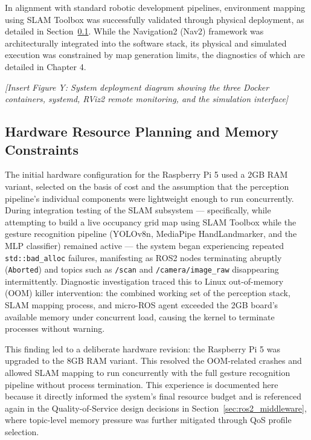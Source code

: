 In alignment with standard robotic development pipelines, environment mapping using SLAM Toolbox was successfully validated through physical deployment, as detailed in Section~\ref{sec:ram_planning}. While the Navigation2 (Nav2) framework was architecturally integrated into the software stack, its physical and simulated execution was constrained by map generation limits, the diagnostics of which are detailed in Chapter 4.

\textit{[Insert Figure Y: System deployment diagram showing the three Docker containers, systemd, RViz2 remote monitoring, and the simulation interface]}

\subsection{Hardware Resource Planning and Memory Constraints}
\label{sec:ram_planning}

The initial hardware configuration for the Raspberry Pi 5 used a 2GB RAM variant,
selected on the basis of cost and the assumption that the perception pipeline's
individual components were lightweight enough to run concurrently. During integration
testing of the SLAM subsystem — specifically, while attempting to build a live
occupancy grid map using SLAM Toolbox while the gesture recognition pipeline (YOLOv8n,
MediaPipe HandLandmarker, and the MLP classifier) remained active — the system began
experiencing repeated \texttt{std::bad\_alloc} failures, manifesting as ROS2 nodes
terminating abruptly (\texttt{Aborted}) and topics such as \texttt{/scan} and
\texttt{/camera/image\_raw} disappearing intermittently. Diagnostic investigation traced
this to Linux out-of-memory (OOM) killer intervention: the combined working set of the
perception stack, SLAM mapping process, and micro-ROS agent exceeded the 2GB board's
available memory under concurrent load, causing the kernel to terminate processes
without warning.

This finding led to a deliberate hardware revision: the Raspberry Pi 5 was upgraded to
the 8GB RAM variant. This resolved the OOM-related crashes and allowed SLAM mapping to
run concurrently with the full gesture recognition pipeline without process
termination. This experience is documented here because it directly informed the
system's final resource budget and is referenced again in the Quality-of-Service design
decisions in Section~\ref{sec:ros2_middleware}, where topic-level memory pressure was further mitigated
through QoS profile selection.


